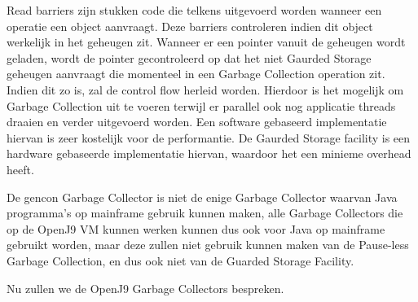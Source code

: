 Read barriers zijn stukken code die telkens uitgevoerd worden wanneer een operatie een object aanvraagt.
Deze barriers controleren indien dit object werkelijk in het geheugen zit.
Wanneer er een pointer vanuit de geheugen wordt geladen, wordt de pointer gecontroleerd op dat het niet Gaurded Storage geheugen aanvraagt die momenteel in een Garbage Collection operation zit.
Indien dit zo is, zal de control flow herleid worden.
Hierdoor is het mogelijk om Garbage Collection uit te voeren terwijl er parallel ook nog applicatie threads draaien en verder uitgevoerd worden.\autocite{Pinto2017}
Een software gebaseerd implementatie hiervan is zeer kostelijk voor de performantie. \autocite{LloydHosking1998}
De Gaurded Storage facility is een hardware gebaseerde implementatie hiervan, waardoor het een minieme overhead heeft.



De gencon Garbage Collector is niet de enige Garbage Collector waarvan Java programma's op mainframe gebruik kunnen maken, alle Garbage Collectors die op de OpenJ9 VM kunnen werken kunnen dus ook voor Java op mainframe gebruikt worden, maar deze zullen niet gebruik kunnen maken van de Pause-less Garbage Collection, en dus ook niet van de Guarded Storage Facility.


Nu zullen we de OpenJ9 Garbage Collectors bespreken.

